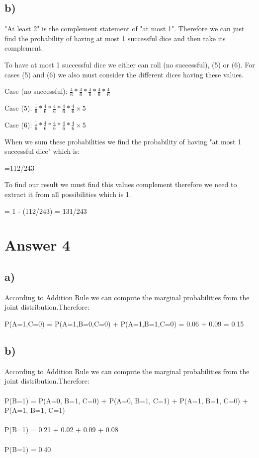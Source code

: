 \documentclass[12pt]{article}
\begin{document}
\subsection*{b)}
"At least 2" is the complement statement of "at most 1". Therefore we can just find the probability of having at most 1 successful dice and then take its complement. \\ \par 
To have at most 1 successful dice we either can roll (no successful), (5) or (6). For cases (5) and (6) we also must consider the different dices having these values.\\ \par 
Case (no successful): $\frac{4}{6} \ast \frac{4}{6} \ast \frac{4}{6} \ast \frac{4}{6} \ast \frac{4}{6}$ \\ \par 
Case (5): $\frac{1}{6} \ast \frac{4}{6} \ast \frac{4}{6} \ast \frac{4}{6} \ast \frac{4}{6} \times 5$ \\ \par
Case (6): $\frac{1}{6} \ast \frac{4}{6} \ast \frac{4}{6} \ast \frac{4}{6} \ast \frac{4}{6} \times 5$ \\ \par
When we sum these probabilities we find the probability of having "at most 1 successful dice" which is:\\ \par 
=112/243\\ \par 
To find our result we must find this values complement therefore we need to extract it from all possibilities which is 1. \\ \par 
= 1 - (112/243) = 131/243
\section*{Answer 4}
\subsection*{a)}
According to Addition Rule we can compute the marginal probabilities from the joint distribution.Therefore: \\ \par 
P(A=1,C=0) = P(A=1,B=0,C=0) + P(A=1,B=1,C=0) = 0.06 + 0.09 = 0.15 
\subsection*{b)}
According to Addition Rule we can compute the marginal probabilities from the joint distribution.Therefore: \\ \\
P(B=1) = P(A=0, B=1, C=0) + P(A=0, B=1, C=1) + P(A=1, B=1, C=0) + P(A=1, B=1, C=1)\\ \\ 
P(B=1) = 0.21 + 0.02 + 0.09 + 0.08 \\ \\
P(B=1) = 0.40
\end{document}
